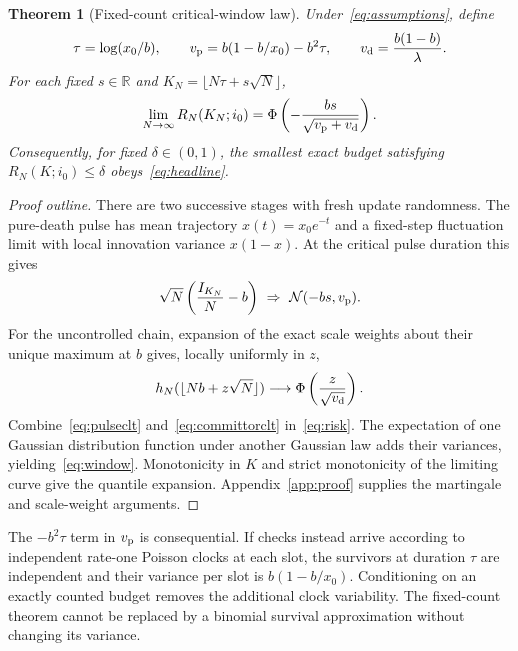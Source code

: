 \documentclass[11pt]{article}
\newtheorem{theorem}{Theorem}
\theoremstyle{remark}\newtheorem{remark}[theorem]{Remark}
\newcommand{\N}{\mathcal N}\newcommand{\ind}{\mathbf 1}
\begin{document}
\begin{theorem}[Fixed-count critical-window law]
\label{thm:window}
Under~\eqref{eq:assumptions}, define
\begin{equation}
 \tau=\log(x_0/b),\qquad
 v_{\rm p}=b(1-b/x_0)-b^2\tau,\qquad
 v_{\rm d}=\frac{b(1-b)}{\lambda}.
 \label{eq:variances}
\end{equation}
For each fixed $s\in\mathbb R$ and $K_N=\lfloor N\tau+s\sqrt N\rfloor$,
\begin{equation}
 \lim_{N\to\infty}R_N(K_N;i_0)
 =\Phi\left(-\frac{bs}{\sqrt{v_{\rm p}+v_{\rm d}}}\right).
 \label{eq:window}
\end{equation}
Consequently, for fixed $\delta\in(0,1)$, the smallest exact budget satisfying $R_N(K;i_0)\le\delta$ obeys~\eqref{eq:headline}.
\end{theorem}

\begin{proof}[Proof outline]
There are two successive stages with fresh update randomness. The pure-death pulse has mean trajectory $x(t)=x_0e^{-t}$ and a fixed-step fluctuation limit with local innovation variance $x(1-x)$. At the critical pulse duration this gives
\begin{equation}
 \sqrt N\left(\frac{I_{K_N}}N-b\right)\ \Rightarrow\ \N(-bs,v_{\rm p}).
 \label{eq:pulseclt}
\end{equation}
For the uncontrolled chain, expansion of the exact scale weights about their unique maximum at $b$ gives, locally uniformly in $z$,
\begin{equation}
 h_N(\lfloor Nb+z\sqrt N\rfloor)\longrightarrow
 \Phi\left(\frac z{\sqrt{v_{\rm d}}}\right).
 \label{eq:committorclt}
\end{equation}
Combine~\eqref{eq:pulseclt} and~\eqref{eq:committorclt} in~\eqref{eq:risk}. The expectation of one Gaussian distribution function under another Gaussian law adds their variances, yielding~\eqref{eq:window}. Monotonicity in $K$ and strict monotonicity of the limiting curve give the quantile expansion. Appendix~\ref{app:proof} supplies the martingale and scale-weight arguments.
\end{proof}

The $-b^2\tau$ term in $v_{\rm p}$ is consequential. If checks instead arrive according to independent rate-one Poisson clocks at each slot, the survivors at duration $\tau$ are independent and their variance per slot is $b(1-b/x_0)$. Conditioning on an exactly counted budget removes the additional clock variability. The fixed-count theorem cannot be replaced by a binomial survival approximation without changing its variance.
\end{document}
